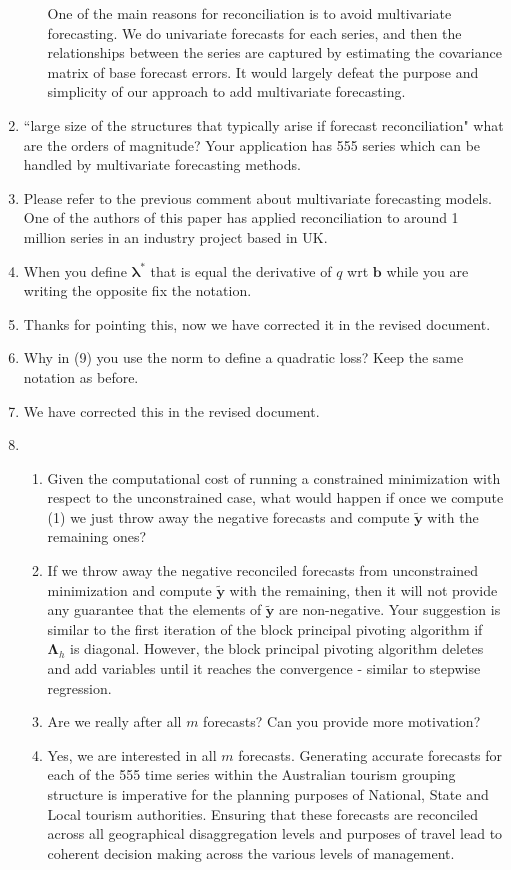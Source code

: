 \documentclass[10pt,a4paper]{article}
\begin{document}
\begin{enumerate}
\begin{enumerate}
{	One of the main reasons for reconciliation is to avoid multivariate forecasting. We do univariate forecasts for each series, and then the relationships between the series are captured by estimating the covariance matrix of base forecast errors. It would largely defeat the purpose and simplicity of our approach to add multivariate forecasting.}
\end{enumerate}
\item ``large size of the structures that typically arise if forecast reconciliation" what are the orders of magnitude? Your application has 555 series which can be handled by multivariate forecasting methods.
\item [] {\color{blue} Please refer to the previous comment about multivariate forecasting models. One of the authors of this paper has applied reconciliation to around 1 million series in an industry project based in UK.}
\item When you define $\bm{\lambda}^*$ that is equal the derivative of $q$ wrt $\bm{b}$ while you are writing the opposite fix the notation.
\item [] {\color{blue} Thanks for pointing this, now we have corrected it in the revised document.}
\item Why in (9) you use the norm to define a quadratic loss? Keep the same notation as before.
\item [] {\color{blue} We have corrected this in the revised document.}
\item \begin{enumerate}
	\item Given the computational cost of running a constrained minimization with respect to the unconstrained case, what would happen if once we compute (1) we just throw away the negative forecasts and compute $\tilde{\bm{y}}$ with the remaining ones?
	\item [] {\color{blue} If we throw away the negative reconciled forecasts from unconstrained minimization and compute $\tilde{\bm{y}}$ with the remaining, then it will not provide any guarantee that the elements of $\tilde{\bm{y}}$ are non-negative. Your suggestion is similar to the first iteration of the block principal pivoting algorithm if $\bm{\Lambda}_h$ is diagonal. However, the block principal pivoting algorithm deletes and add variables until it reaches the convergence - similar to stepwise regression.}
	\item Are we really after all $m$ forecasts? Can you provide more motivation?
	\item [] {\color{blue} Yes, we are interested in all $m$ forecasts. Generating accurate forecasts for each of the 555 time series within the Australian tourism grouping structure is imperative for the planning purposes of National, State and Local tourism authorities. Ensuring that these forecasts are reconciled across all geographical disaggregation levels and purposes of travel lead to coherent decision making across the various levels of management.}

\end{enumerate}
\end{enumerate}
\end{document}
